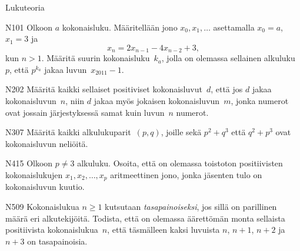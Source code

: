 \begin{bwField}{Lukuteoria}

\begin{bwProblem}{N}{1}{01}
Olkoon $a$ kokonaisluku.
Määritellään jono $x_0,x_1,\ldots$ asettamalla $x_0=a$, $x_1=3$
ja
   $$
x_n=2x_{n-1}-4x_{n-2}+3,
   $$
kun $n>1$. Määritä suurin kokonaisluku~$k_a$, jolla on olemassa
sellainen alkuluku~$p$, että $p^{k_a}$ jakaa luvun~$x_{2011}-1$.
\end{bwProblem}

\begin{bwProblem}{N}{2}{02}
Määritä kaikki sellaiset positiviset kokonaisluvut~$d$, että jos $d$
jakaa kokonaisluvun~$n$, niin $d$ jakaa myös jokaisen kokonaisluvun~$m$,
jonka numerot ovat jossain järjestyksessä samat kuin luvun~$n$
numerot.
\end{bwProblem}

\begin{bwProblem}{N}{3}{07}
Määritä kaikki alkulukuparit~$(p,q)$, joille sekä $p^2+q^3$ että $q^2+p^3$
ovat kokonaisluvun neliöitä.
\end{bwProblem}

\begin{bwProblem}{N}{4}{15}
Olkoon $p\neq 3$ alkuluku.  Osoita, että on olemassa toistoton
positiivisten kokonaislukujen \break $x_1,x_2,\ldots,x_p$ 
aritmeettinen jono, jonka jäsenten tulo on kokonaisluvun kuutio.
\end{bwProblem}

\begin{bwProblem}{N}{5}{09}
Kokonaislukua $n\ge 1$ kutsutaan \emph{tasapainoiseksi}, jos sillä on
parillinen määrä eri alkutekijöitä.  Todista, että on olemassa äärettömän
monta sellaista positiivista kokonaislukua~$n$, että täsmälleen
kaksi luvuista $n$, $n+1$, $n+2$ ja $n+3$ on tasapainoisia.
\end{bwProblem}

\end{bwField}

